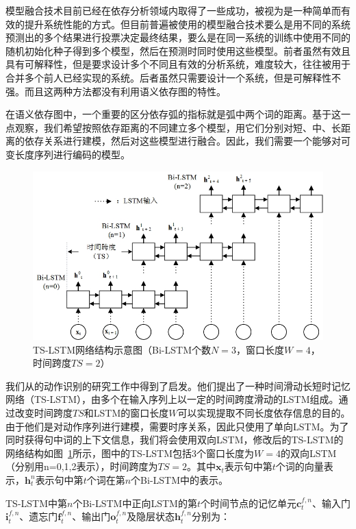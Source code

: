 模型融合技术目前已经在依存分析领域内取得了一些成功，被视为是一种简单而有效的提升系统性能的方式。但目前普遍被使用的模型融合技术要么是用不同的系统预测出的多个结果进行投票决定最终结果，要么是在同一系统的训练中使用不同的随机初始化种子得到多个模型，然后在预测时同时使用这些模型。前者虽然有效且具有可解释性，但是要求设计多个不同且有效的分析系统，难度较大，往往被用于合并多个前人已经实现的系统。后者虽然只需要设计一个系统，但是可解释性不强。而且这两种方法都没有利用语义依存图的特性。

在语义依存图中，一个重要的区分依存弧的指标就是弧中两个词的距离。基于这一点观察，我们希望按照依存距离的不同建立多个模型，用它们分别对短、中、长距离的依存关系进行建模，然后对这些模型进行融合。因此，我们需要一个能够对可变长度序列进行编码的模型。

\begin{figure}[hbtp]
	\centering
	\includegraphics[width=130mm]{picture/ts-lstm.jpg}
	\caption{TS-LSTM网络结构示意图（Bi-LSTM个数$N=3$，窗口长度$W=4$，时间跨度$TS=2$）}
	\label{fig:ts-lstm}
\end{figure}

我们从的动作识别的研究工作中得到了启发。他们提出了一种时间滑动长短时记忆网络（TS-LSTM），由多个在输入序列上以一定的时间跨度滑动的LSTM组成。通过改变时间跨度$TS$和LSTM的窗口长度$W$可以实现提取不同长度依存信息的目的。由于他们是对动作序列进行建模，需要时序关系，因此只使用了单向LSTM。为了同时获得句中词的上下文信息，我们将会使用双向LSTM，修改后的TS-LSTM的网络结构如图~\ref{fig:ts-lstm}所示，图中的TS-LSTM包括3个窗口长度为$W=4$的双向LSTM（分别用n=0,1,2表示），时间跨度为$TS=2$。其中$\mathbf{x}_t$表示句中第$t$个词的向量表示，$\mathbf{h}^n_t$表示句中第$t$个词在第$n$个Bi-LSTM中的表示。

TS-LSTM中第$n$个Bi-LSTM中正向LSTM的第$t$个时间节点的记忆单元$\mathbf{c}^{f,n}_t$、输入门$\mathbf{i}^{f,n}_t$、遗忘门$\mathbf{f}^{f,n}_t$、输出门$\mathbf{o}^{f,n}_t$及隐层状态$\mathbf{h}^{f,n}_t$分别为：

